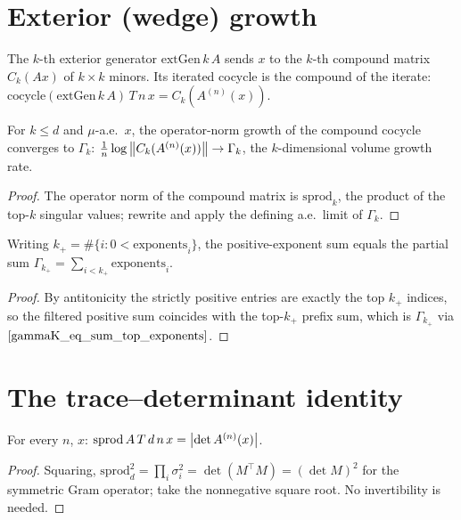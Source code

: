 \section{Exterior (wedge) growth}

\begin{definition}\label{extGen}
  \leanok
  The $k$-th exterior generator $\mathrm{extGen}\,k\,A$ sends $x$ to the $k$-th compound matrix $C_k(A x)$ of $k\times k$ minors. Its iterated cocycle is the compound of the iterate: $\mathrm{cocycle}(\mathrm{extGen}\,k\,A)\,T\,n\,x = C_k(A^{(n)}(x))$.
\end{definition}

\begin{theorem}\label{tendsto_log_opNorm_compound_cocycle}
  \leanok
  For $k \le d$ and $\mu$-a.e.\ $x$, the operator-norm growth of the compound cocycle converges to $\Gamma_k$: $\tfrac1n\log\left\lVert C_k(A^{(n)}(x)) \right\rVert \to \Gamma_k$, the $k$-dimensional volume growth rate.
\end{theorem}
\begin{proof}\leanok
  The operator norm of the compound matrix is $\mathrm{sprod}_k$, the product of the top-$k$ singular values; rewrite and apply the defining a.e.\ limit of $\Gamma_k$.
\end{proof}

\begin{corollary}\label{sumPosExp_eq_gammaK_card_pos}
  \leanok
  Writing $k_+ = \#\{i : 0 < \mathrm{exponents}_i\}$, the positive-exponent sum equals the partial sum $\Gamma_{k_+} = \sum_{i<k_+}\mathrm{exponents}_i$.
\end{corollary}
\begin{proof}\leanok
  By antitonicity the strictly positive entries are exactly the top $k_+$ indices, so the filtered positive sum coincides with the top-$k_+$ prefix sum, which is $\Gamma_{k_+}$ via $\ref{gammaK_eq_sum_top_exponents}$.
\end{proof}

\section{The trace--determinant identity}

\begin{lemma}\label{sprod_d_eq_abs_det}
  \leanok
  For every $n$, $x$: $\mathrm{sprod}\,A\,T\,d\,n\,x = \left\lvert \det A^{(n)}(x) \right\rvert$.
\end{lemma}
\begin{proof}\leanok
  Squaring, $\mathrm{sprod}_d^2 = \prod_i \sigma_i^2 = \det(M^{\top} M) = (\det M)^2$ for the symmetric Gram operator; take the nonnegative square root. No invertibility is needed.
\end{proof}

